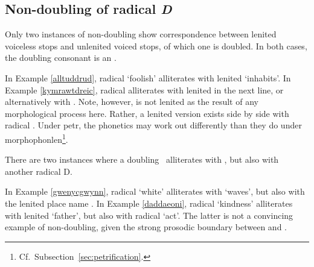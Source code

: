 \subsection{Non-doubling of radical \textit{D}}
\label{sec:non-doubling-radical}
Only two instances of non-doubling show correspondence between lenited voiceless stops and unlenited voiced stops, of which one is doubled. In both cases, the doubling consonant is an \xD.
\begin{mwl}
\end{mwl}
In Example \ref{alltuddrud}, radical  `foolish' alliterates with lenited  `inhabits'. In Example \ref{kymrawtdreic},  radical  alliterates with lenited  in the next line, or alternatively with . Note, however,  is not lenited as the result of any morphological process here. Rather, a lenited version exists side by side with radical . Under \gls{petr}, the phonetics may work out differently than they do under \gls{morphophonlen}\footnote{Cf.\  Subsection~\ref{sec:petrification}.}. 

There are two instances where a doubling \xD\ alliterates with \lT, but also with another radical \gls{D}. 
\begin{mwl}
\end{mwl}
In Example \ref{gwenycgwynn}, radical  `white' alliterates with  `waves', but also with the lenited place name . In Example \ref{daddaeoni}, radical  `kindness' alliterates with  lenited  `father', but also with radical  `act'. The latter is not a convincing example of non-doubling, given the strong  prosodic boundary between  and .

